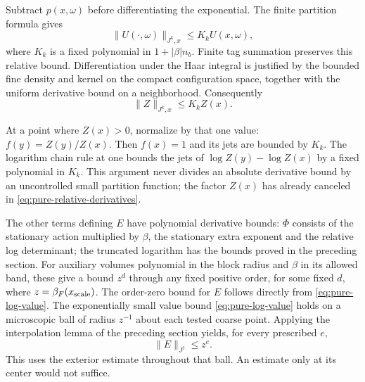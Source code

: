 Subtract $p(x,\omega)$ before differentiating the exponential.
The finite partition formula gives
\[
               \|U(\cdot,\omega)\|_{J^k,x}
                                      \le K_k U(x,\omega),
\]
where $K_k$ is a fixed polynomial in $1+|\beta|n_b$.
Finite tag summation preserves this relative bound. Differentiation
under the Haar integral is justified by the bounded fine density
and kernel on the compact configuration space, together with the
uniform derivative bound on a neighborhood. Consequently
\begin{equation}\label{eq:pure-relative-derivatives}
                            \|Z\|_{J^k,x}\le K_k Z(x).
\end{equation}

At a point where $Z(x)>0$, normalize by that one value:
$f(y)=Z(y)/Z(x)$. Then $f(x)=1$ and its jets are bounded by $K_k$.
The logarithm chain rule at one bounds the jets of
$\log Z(y)-\log Z(x)$ by a fixed polynomial in $K_k$. This argument
never divides an absolute derivative bound by an uncontrolled small
partition function; the factor $Z(x)$ has already canceled in
\eqref{eq:pure-relative-derivatives}.

The other terms defining $E$ have polynomial derivative bounds:
$\Phi$ consists of the stationary action multiplied by $\beta$,
the stationary extra exponent and the relative log determinant;
the truncated logarithm has the bounds proved in the preceding
section. For auxiliary volumes polynomial in the block radius and
$\beta$ in its allowed band, these give a bound $z^d$ through any
fixed positive order, for some fixed $d$, where $z=\beta_F(x_{\rm scale})$.
The order-zero bound for $E$ follows directly from
\eqref{eq:pure-log-value}.
The exponentially small value bound
\eqref{eq:pure-log-value} holds on a microscopic ball of radius
$z^{-1}$ about each tested coarse point. Applying the interpolation
lemma of the preceding section yields, for every prescribed $e$,
\begin{equation}\label{eq:pure-log-jets}
                              \|E\|_{J^j}\le z^e.
\end{equation}
This uses the exterior estimate throughout that ball. An estimate
only at its center would not suffice.

